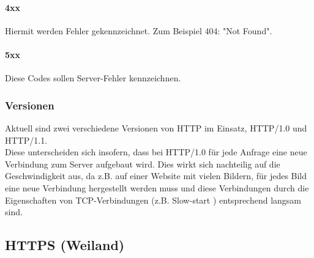 \paragraph{4xx}
Hiermit werden Fehler gekennzeichnet. Zum Beispiel 404: "Not Found".
\paragraph{5xx}
Diese Codes sollen Server-Fehler kennzeichnen.

\subsubsection{Versionen}
Aktuell sind zwei verschiedene Versionen von HTTP im Einsatz, HTTP/1.0 und HTTP/1.1.
\\
Diese unterscheiden sich insofern, dass bei HTTP/1.0 für jede Anfrage eine neue Verbindung zum Server aufgebaut wird. Dies wirkt sich nachteilig auf die Geschwindigkeit aus, da z.B. auf einer Website mit vielen Bildern, für jedes Bild eine neue Verbindung hergestellt werden muss und diese Verbindungen durch die Eigenschaften von TCP-Verbindungen (z.B. Slow-start ) entsprechend langsam sind.

\subsection{HTTPS (Weiland)}
